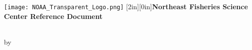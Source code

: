 \begin{titlingpage}
\crdfontfamily
\texttt{[image: NOAA\_Transparent\_Logo.png]}
\raisebox{1.5in}[2in][0in]{\large \textbf{Northeast Fisheries Science Center Reference Document \crdnumber}}
\vspace*{\fill}
\begin{center}
\Large
{\LARGE \textbf{\crdtitle}}\\
\vspace*{11ex}
by \crdauthors\\[3ex]
\vspace*{\fill}
\crddate
\end{center}
\end{titlingpage}
